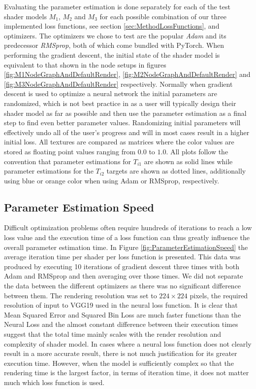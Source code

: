 Evaluating the parameter estimation is done separately for each of the test shader models $M_1$, $M_2$ and $M_3$ for each possible combination of our three implemented loss functions, see section \ref{sec:MethodLossFunctions}, and optimizers. The optimizers we chose to test are the popular \textit{Adam} and its predecessor \textit{RMSprop}, both of which come bundled with PyTorch. When performing the gradient descent, the initial state of the shader model is equivalent to that shown in the node setups in figures \ref{fig:M1NodeGraphAndDefaultRender}, \ref{fig:M2NodeGraphAndDefaultRender} and \ref{fig:M3NodeGraphAndDefaultRender} respectively. Normally when gradient descent is used to optimize a neural network the initial parameters are randomized, which is not best practice in \dipter{} as a user will typically design their shader model as far as possible and then use the parameter estimation as a final step to find even better parameter values. Randomizing initial parameters will effectively undo all of the user's progress and will in most cases result in a higher initial loss. All textures are compared as matrices where the color values are stored as floating point values ranging from $0.0$ to $1.0$. All plots follow the convention that parameter estimations for $T_{i1}$ are shown as solid lines while parameter estimations for the $T_{i2}$ targets are shown as dotted lines, additionally using blue or orange color when using Adam or RMSprop, respectively.

\subsection{Parameter Estimation Speed}\label{sec:EvalParameterEstimationSpeed}


Difficult optimization problems often require hundreds of iterations to reach a low loss value and the execution time of a loss function can thus greatly influence the overall parameter estimation time. In Figure \ref{fig:ParameterEstimationSpeed} the average iteration time per shader per loss function is presented. This data was produced by executing 10 iterations of gradient descent three times with both Adam and RMSprop and then averaging over those times. We did not separate the data between the different optimizers as there was no significant difference between them. The rendering resolution was set to $224\times224$ pixels, the required resolution of input to VGG19 used in the neural loss function. It is clear that Mean Squared Error and Squared Bin Loss are much faster functions than the Neural Loss and the almost constant difference between their execution times suggest that the total time mainly scales with the render resolution and complexity of shader model. In cases where a neural loss function does not clearly result in a more accurate result, there is not much justification for its greater execution time. However, when the model is sufficiently complex so that the rendering time is the largest factor, in terms of iteration time, it does not matter much which loss function is used. 

